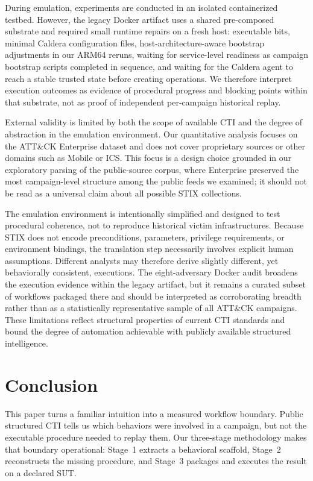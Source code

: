 \documentclass[sigconf]{acmart}
\newcommand{\stix}{STIX\xspace}
\newcommand{\attack}{ATT\&CK\xspace}
\newcommand{\caldera}{Caldera\xspace}
\begin{document}
During emulation, experiments are conducted in an isolated containerized testbed. However, the legacy Docker artifact uses a shared pre-composed substrate and required small runtime repairs on a fresh host: executable bits, minimal \caldera{} configuration files, host-architecture-aware bootstrap adjustments in our ARM64 reruns, waiting for service-level readiness as campaign bootstrap scripts completed in sequence, and waiting for the \caldera{} agent to reach a stable trusted state before creating operations. We therefore interpret execution outcomes as evidence of procedural progress and blocking points within that substrate, not as proof of independent per-campaign historical replay.

External validity is limited by both the scope of available CTI and the degree of abstraction in the emulation environment. Our quantitative analysis focuses on the \attack{} Enterprise dataset and does not cover proprietary sources or other domains such as Mobile or ICS. This focus is a design choice grounded in our exploratory parsing of the public-source corpus, where Enterprise preserved the most campaign-level structure among the public feeds we examined; it should not be read as a universal claim about all possible \stix{} collections.

The emulation environment is intentionally simplified and designed to test procedural coherence, not to reproduce historical victim infrastructures. Because \stix{} does not encode preconditions, parameters, privilege requirements, or environment bindings, the translation step necessarily involves explicit human assumptions. Different analysts may therefore derive slightly different, yet behaviorally consistent, executions. The eight-adversary Docker audit broadens the execution evidence within the legacy artifact, but it remains a curated subset of workflows packaged there and should be interpreted as corroborating breadth rather than as a statistically representative sample of all \attack{} campaigns. These limitations reflect structural properties of current CTI standards and bound the degree of automation achievable with publicly available structured intelligence.

\section{Conclusion}
\label{sec:conclusion}

This paper turns a familiar intuition into a measured workflow boundary. Public structured CTI tells us which behaviors were involved in a campaign, but not the executable procedure needed to replay them. Our three-stage methodology makes that boundary operational: Stage~1 extracts a behavioral scaffold, Stage~2 reconstructs the missing procedure, and Stage~3 packages and executes the result on a declared SUT.
\end{document}
